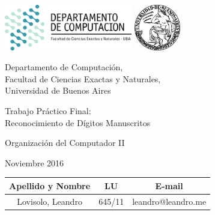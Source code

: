 \documentclass[a4paper, 10pt, twoside]{article}
\newcommand{\titulolineauno}{Trabajo Práctico Final:}
\newcommand{\titulolineados}{Reconocimiento de Dígitos Manuscritos}
\newcommand{\materia}{Organización del Computador II}
\newcommand{\cuatrimestre}{Noviembre 2016}
\begin{document}


\thispagestyle{caratula}

\begin{center}

\includegraphics[height=2cm]{DC.png} 
\hfill
\includegraphics[height=2cm]{UBA.jpg} 

\vspace{2cm}

Departamento de Computación,\\
Facultad de Ciencias Exactas y Naturales,\\
Universidad de Buenos Aires

\vspace{4cm}

\begin{Huge}
\titulolineauno \\
\titulolineados
\end{Huge}

\vspace{0.5cm}

\begin{Large}
\materia
\end{Large}

\vspace{1cm}

\cuatrimestre

\vspace{4cm}

\begin{tabular}{|c|c|c|}
\hline
Apellido y Nombre & LU & E-mail\\
\hline
Lovisolo, Leandro      & 645/11 & leandro@leandro.me\\
\hline
\end{tabular}

\end{center}
\end{document}

